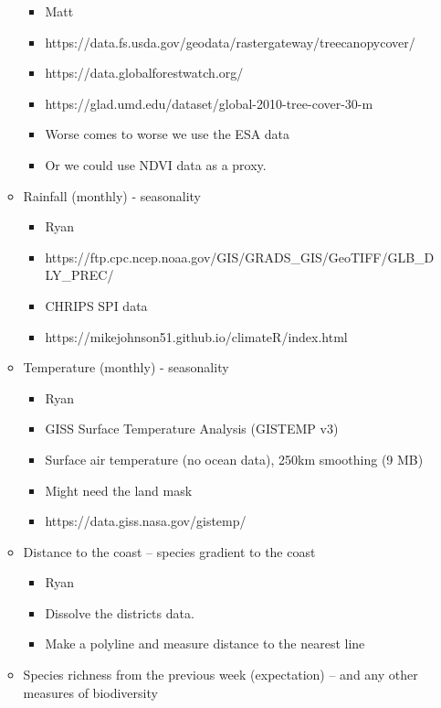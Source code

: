 \documentclass[
  letterpaper,
]{article}
\providecommand{\tightlist}{%
  \setlength{\itemsep}{0pt}\setlength{\parskip}{0pt}}\usepackage{longtable,booktabs,array}
\begin{document}
\begin{tcolorbox}
\begin{itemize}
\begin{itemize}
    \begin{itemize}
    \tightlist
    \item
      Matt
    \item
      https://data.fs.usda.gov/geodata/rastergateway/treecanopycover/
    \item
      https://data.globalforestwatch.org/
    \item
      https://glad.umd.edu/dataset/global-2010-tree-cover-30-m
    \item
      Worse comes to worse we use the ESA data
    \item
      Or we could use NDVI data as a proxy.
    \end{itemize}
  \item
    Rainfall (monthly) - seasonality

    \begin{itemize}
    \tightlist
    \item
      Ryan
    \item
      https://ftp.cpc.ncep.noaa.gov/GIS/GRADS\_GIS/GeoTIFF/GLB\_DLY\_PREC/
    \item
      CHRIPS SPI data
    \item
      https://mikejohnson51.github.io/climateR/index.html
    \end{itemize}
  \item
    Temperature (monthly) - seasonality

    \begin{itemize}
    \tightlist
    \item
      Ryan
    \item
      GISS Surface Temperature Analysis (GISTEMP v3)
    \item
      Surface air temperature (no ocean data), 250km smoothing (9 MB)
    \item
      Might need the land mask
    \item
      https://data.giss.nasa.gov/gistemp/
    \end{itemize}
  \item
    Distance to the coast -- species gradient to the coast

    \begin{itemize}
    \tightlist
    \item
      Ryan
    \item
      Dissolve the districts data.
    \item
      Make a polyline and measure distance to the nearest line
    \end{itemize}
  \item
    Species richness from the previous week (expectation) -- and any
    other measures of biodiversity


\end{itemize}
\end{itemize}
\end{tcolorbox}
\end{document}
